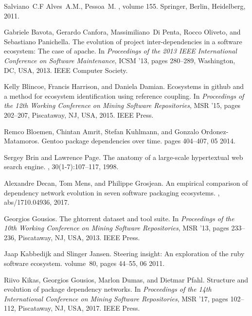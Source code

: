 \documentclass[10pt,conference]{IEEEtran}
\begin{document}
\begin{thebibliography}{10}

  Salviano~C.F Alves~A.M., Pessoa~M.
  , volume 155.
  \newblock Springer, Berlin, Heidelberg, 2011.
  
  Gabriele Bavota, Gerardo Canfora, Massimiliano~Di Penta, Rocco Oliveto, and
    Sebastiano Panichella.
  \newblock The evolution of project inter-dependencies in a software ecosystem:
    The case of apache.
  \newblock In {\em Proceedings of the 2013 IEEE International Conference on
    Software Maintenance}, ICSM '13, pages 280--289, Washington, DC, USA, 2013.
    IEEE Computer Society.
  
  Kelly Blincoe, Francis Harrison, and Daniela Damian.
  \newblock Ecosystems in github and a method for ecosystem identification using
    reference coupling.
  \newblock In {\em Proceedings of the 12th Working Conference on Mining Software
    Repositories}, MSR '15, pages 202--207, Piscataway, NJ, USA, 2015. IEEE
    Press.
  
  Remco Bloemen, Chintan Amrit, Stefan Kuhlmann, and Gonzalo Ordonez-Matamoros.
  \newblock Gentoo package dependencies over time.
  \newblock pages 404--407, 05 2014.
  
  Sergey Brin and Lawrence Page.
  \newblock The anatomy of a large-scale hypertextual web search engine.
  , 30(1-7):107--117, 1998.
  
  Alexandre Decan, Tom Mens, and Philippe Grosjean.
  \newblock An empirical comparison of dependency network evolution in seven
    software packaging ecosystems.
  , abs/1710.04936, 2017.
  
  Georgios Gousios.
  \newblock The ghtorrent dataset and tool suite.
  \newblock In {\em Proceedings of the 10th Working Conference on Mining Software
    Repositories}, MSR '13, pages 233--236, Piscataway, NJ, USA, 2013. IEEE
    Press.
  
  Jaap Kabbedijk and Slinger Jansen.
  \newblock Steering insight: An exploration of the ruby software ecosystem.
  \newblock volume~80, pages 44--55, 06 2011.
  
  Riivo Kikas, Georgios Gousios, Marlon Dumas, and Dietmar Pfahl.
  \newblock Structure and evolution of package dependency networks.
  \newblock In {\em Proceedings of the 14th International Conference on Mining
    Software Repositories}, MSR '17, pages 102--112, Piscataway, NJ, USA, 2017.
    IEEE Press.
  

\end{thebibliography}
\end{document}
